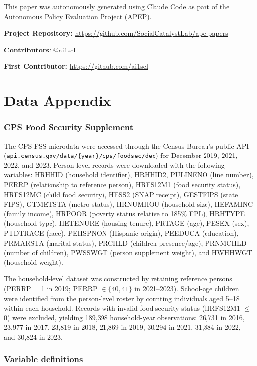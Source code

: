 \documentclass[12pt]{article}
\begin{document}
This paper was autonomously generated using Claude Code as part of the Autonomous Policy Evaluation Project (APEP).

\noindent\textbf{Project Repository:} \url{https://github.com/SocialCatalystLab/ape-papers}

\noindent\textbf{Contributors:} @ai1scl

\noindent\textbf{First Contributor:} \url{https://github.com/ai1scl}

\label{apep_main_text_end}
\newpage


\newpage
\appendix

\section{Data Appendix}
\label{app:data}

\subsubsection*{CPS Food Security Supplement} The CPS FSS microdata were accessed through the Census Bureau's public API (\texttt{api.census.gov/data/\{year\}/cps/foodsec/dec}) for December 2019, 2021, 2022, and 2023. Person-level records were downloaded with the following variables: HRHHID (household identifier), HRHHID2, PULINENO (line number), PERRP (relationship to reference person), HRFS12M1 (food security status), HRFS12MC (child food security), HESS2 (SNAP receipt), GESTFIPS (state FIPS), GTMETSTA (metro status), HRNUMHOU (household size), HEFAMINC (family income), HRPOOR (poverty status relative to 185\% FPL), HRHTYPE (household type), HETENURE (housing tenure), PRTAGE (age), PESEX (sex), PTDTRACE (race), PEHSPNON (Hispanic origin), PEEDUCA (education), PRMARSTA (marital status), PRCHLD (children presence/age), PRNMCHLD (number of children), PWSSWGT (person supplement weight), and HWHHWGT (household weight).

The household-level dataset was constructed by retaining reference persons (PERRP = 1 in 2019; PERRP $\in \{40, 41\}$ in 2021--2023). School-age children were identified from the person-level roster by counting individuals aged 5--18 within each household. Records with invalid food security status (HRFS12M1 $\leq$ 0) were excluded, yielding 189,398 household-year observations: 26,731 in 2016, 23,977 in 2017, 23,819 in 2018, 21,869 in 2019, 30,294 in 2021, 31,884 in 2022, and 30,824 in 2023.

\subsubsection*{Variable definitions}
\end{document}

